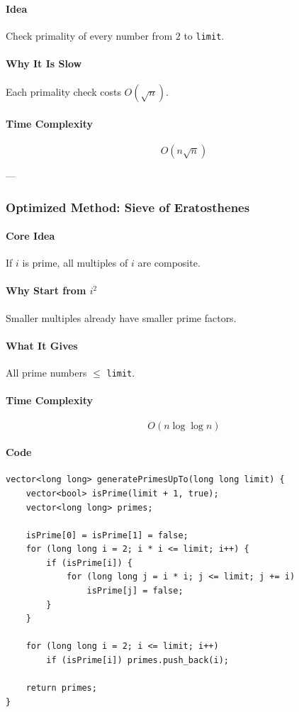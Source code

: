 \documentclass[11pt]{article}
\begin{document}
\paragraph{Idea}
Check primality of every number from $2$ to \texttt{limit}.

\paragraph{Why It Is Slow}
Each primality check costs $O(\sqrt{n})$.

\paragraph{Time Complexity}
\[
O(n\sqrt{n})
\]

---

\subsubsection{Optimized Method: Sieve of Eratosthenes}

\paragraph{Core Idea}
If $i$ is prime, all multiples of $i$ are composite.

\paragraph{Why Start from $i^2$}
Smaller multiples already have smaller prime factors.

\paragraph{What It Gives}
All prime numbers $\le$ \texttt{limit}.

\paragraph{Time Complexity}
\[
O(n \log \log n)
\]

\paragraph{Code}
\begin{lstlisting}
vector<long long> generatePrimesUpTo(long long limit) {
    vector<bool> isPrime(limit + 1, true);
    vector<long long> primes;

    isPrime[0] = isPrime[1] = false;
    for (long long i = 2; i * i <= limit; i++) {
        if (isPrime[i]) {
            for (long long j = i * i; j <= limit; j += i)
                isPrime[j] = false;
        }
    }

    for (long long i = 2; i <= limit; i++)
        if (isPrime[i]) primes.push_back(i);

    return primes;
}
\end{lstlisting}
\end{document}
